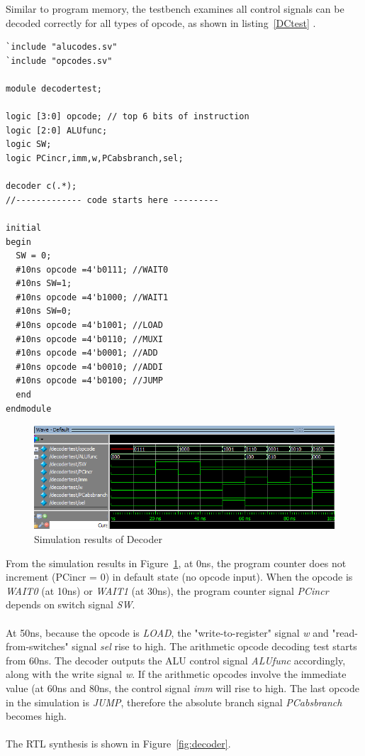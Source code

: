 Similar to program memory, the testbench examines all control signals can be decoded correctly for all types of opcode, as shown in listing~\ref{DCtest} .

\begin{lstlisting}
`include "alucodes.sv"
`include "opcodes.sv"

module decodertest;

logic [3:0] opcode; // top 6 bits of instruction
logic [2:0] ALUfunc;
logic SW;
logic PCincr,imm,w,PCabsbranch,sel;

decoder c(.*);
//------------- code starts here ---------

initial 
begin
  SW = 0;	
  #10ns opcode =4'b0111; //WAIT0
  #10ns SW=1; 
  #10ns opcode =4'b1000; //WAIT1
  #10ns SW=0;
  #10ns opcode =4'b1001; //LOAD
  #10ns opcode =4'b0110; //MUXI
  #10ns opcode =4'b0001; //ADD
  #10ns opcode =4'b0010; //ADDI
  #10ns opcode =4'b0100; //JUMP
  end
endmodule 
\end{lstlisting}

\begin{figure}[H]
		\centering
		\includegraphics[width = \textwidth]{Figures/DC}		
		\caption{Simulation results of Decoder}
		\label {fig:DCtest}
\end{figure}

From the simulation results in Figure~\ref{fig:DCtest}, at 0ns, the program counter does not increment (PCincr = 0) in default state (no opcode input). When the opcode is \textit{ WAIT0} (at 10ns) or \textit{WAIT1} (at 30ns), the program counter signal \textit{PCincr} depends on switch signal \textit{SW}. \\\\
At 50ns, because the opcode is \textit{LOAD}, the "write-to-register" signal \textit{w} and "read-from-switches" signal \textit{sel} rise to high. The arithmetic opcode decoding test starts from 60ns. The decoder outputs the ALU control signal \textit{ALUfunc} accordingly, along with the write signal \textit{w}. If the arithmetic opcodes involve the immediate value (at 60ns and 80ns, the control signal \textit{imm} will rise to high. The last opcode in the simulation is \textit{JUMP}, therefore the absolute branch signal \textit{PCabsbranch} becomes high.\\\\
The RTL synthesis is shown in Figure~\ref{fig:decoder}.


